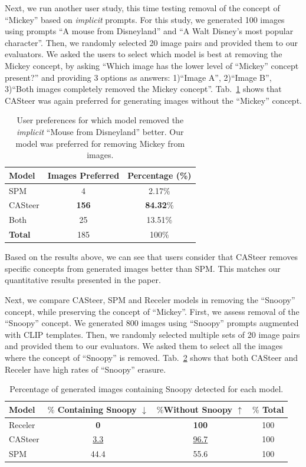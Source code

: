 Next, we run another user study, this time testing removal of the concept of ``Mickey'' based on \textit{implicit} prompts. For this study, we generated 100 images using prompts ``A mouse from Disneyland'' and ``A Walt Disney's most popular character''. Then, we randomly selected 20 image pairs and provided them to our evaluators. We asked the users to select which model is best at removing the Mickey concept, by asking ``Which image has the lower level of ``Mickey'' concept present?'' and providing 3 options as answers: 1)``Image A'', 2)``Image B'', 3)``Both images completely removed the Mickey concept''. Tab.~\ref{tab:implicit_mickey} shows that CASteer was again preferred for generating images without the ``Mickey'' concept.

\begin{table}[h!]
    \centering
    \caption{User preferences for which model removed the \textit{implicit} ``Mouse from Disneyland'' better. Our model was preferred for removing Mickey from images.}
    \label{tab:implicit_mickey}
    \begin{tabular}{lcc}
    \hline
    \textbf{Model} & \textbf{Images Preferred} & \textbf{Percentage (\%)} \\
    \hline
    SPM & 4 & 2.17\% \\
    CASteer & \textbf{156} & \textbf{84.32}\% \\
    Both & 25 & 13.51\% \\
    \hline
    \textbf{Total} & 185 & 100\% \\
    \hline
    \end{tabular}
\end{table}

Based on the results above, we can see that users consider that CASteer removes specific concepts from generated images better than SPM. This matches our quantitative results presented in the paper.

Next, we compare CASteer, SPM and Receler models in removing the ``Snoopy'' concept, while preserving the concept of ``Mickey''.  First, we assess removal of the ``Snoopy'' concept. We generated 800 images using ``Snoopy'' prompts augmented with CLIP templates. Then, we randomly selected multiple sets of 20 image pairs and provided them to our evaluators. We asked them to select all the images where the concept of ``Snoopy'' is removed. Tab.~\ref{tab:3models_snoopy_rem_snoopy} shows that both CASteer and Receler have high rates of ``Snoopy'' erasure.

\begin{table}[h!]
\centering
\caption{Percentage of generated images containing Snoopy detected for each model.}
\label{tab:3models_snoopy_rem_snoopy}
\begin{tabular}{lccc}
\hline
\textbf{Model} & \textbf{$\%$ Containing Snoopy $\downarrow$} & \textbf{$\%$Without Snoopy $\uparrow$} & \textbf{$\%$ Total} \\
\hline
Receler & \textbf{0} & \textbf{100} & 100 \\
CASteer & \underline{3.3} & \underline{96.7} & 100 \\
SPM & 44.4  & 55.6 & 100 \\
\hline
\end{tabular}
\end{table}

